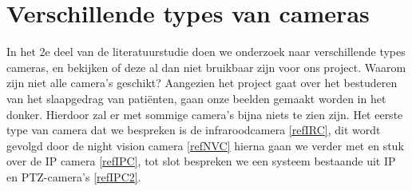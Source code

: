 \section{Verschillende types van cameras}
\label{refTVC}
In het 2e deel van de literatuurstudie doen we onderzoek naar verschillende types cameras, en bekijken of deze al dan niet bruikbaar zijn voor ons project. Waarom zijn niet alle camera's geschikt? Aangezien het project gaat over het bestuderen van het slaapgedrag van pati\"enten, gaan onze beelden gemaakt worden in het donker. Hierdoor zal er met sommige camera's bijna niets te zien zijn. Het eerste type van camera dat we bespreken is de infraroodcamera \ref{refIRC}, dit wordt gevolgd door de night vision camera \ref{refNVC} hierna gaan we verder met en stuk over de IP camera \ref{refIPC}, tot slot bespreken we een systeem bestaande uit IP en PTZ-camera's \ref{refIPC2}.

